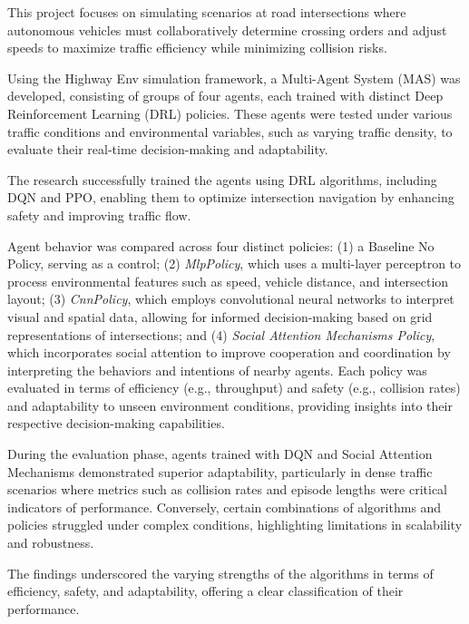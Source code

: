 
This project focuses on simulating scenarios at road intersections where autonomous vehicles must collaboratively determine crossing orders and adjust 
speeds to maximize traffic efficiency while minimizing collision risks.

Using the Highway Env simulation framework, a Multi-Agent System (MAS) was developed, 
consisting of groups of four agents, each trained with distinct Deep Reinforcement Learning (DRL) policies. 
These agents were tested under various traffic conditions and environmental variables, such as varying traffic density, to evaluate their 
real-time decision-making and adaptability.

The research successfully trained the agents using DRL algorithms, including DQN and PPO, 
enabling them to optimize intersection navigation by enhancing safety and improving traffic flow.

Agent behavior was compared across four distinct policies: (1) a Baseline No Policy, serving as a control; (2) \textit{MlpPolicy}, which uses 
a multi-layer perceptron to process environmental features such as speed, vehicle distance, and intersection layout; 
(3) \textit{CnnPolicy}, which employs convolutional neural networks to interpret visual and spatial data, allowing for informed decision-making 
based on grid representations of intersections; 
and (4) \textit{Social Attention Mechanisms Policy}, which incorporates social attention to improve cooperation and coordination 
by interpreting the behaviors and intentions of nearby agents. 
Each policy was evaluated in terms of efficiency (e.g., throughput) and safety (e.g., collision rates) and adaptability to unseen environment conditions,  providing insights into their respective 
decision-making capabilities.

During the evaluation phase, agents trained with DQN and Social Attention Mechanisms demonstrated superior adaptability, particularly in 
dense traffic scenarios where metrics such as collision rates and episode lengths were critical indicators of performance. 
Conversely, certain combinations of algorithms and policies struggled under complex conditions, highlighting limitations in scalability and robustness.

The findings underscored the varying strengths of the algorithms in terms of efficiency, safety, and adaptability, offering a clear 
classification of their performance.
